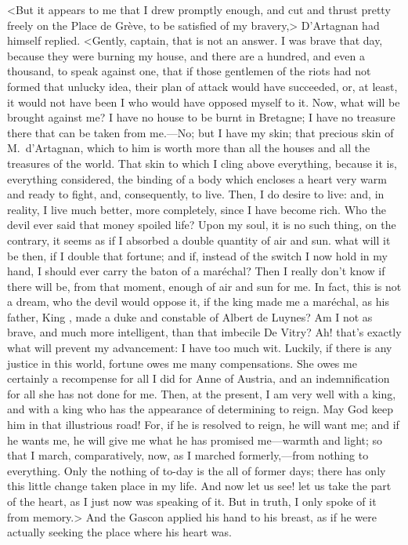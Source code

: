 <But it appears to me that I drew promptly enough, and cut and thrust pretty freely on the Place de Grève, to be satisfied of my bravery,> D'Artagnan had himself replied. <Gently, captain, that is not an answer. I was brave that day, because they were burning my house, and there are a hundred, and even a thousand, to speak against one, that if those gentlemen of the riots had not formed that unlucky idea, their plan of attack would have succeeded, or, at least, it would not have been I who would have opposed myself to it. Now, what will be brought against me? I have no house to be burnt in Bretagne; I have no treasure there that can be taken from me.—No; but I have my skin; that precious skin of M.~d'Artagnan, which to him is worth more than all the houses and all the treasures of the world. That skin to which I cling above everything, because it is, everything considered, the binding of a body which encloses a heart very warm and ready to fight, and, consequently, to live. Then, I do desire to live: and, in reality, I live much better, more completely, since I have become rich. Who the devil ever said that money spoiled life? Upon my soul, it is no such thing, on the contrary, it seems as if I absorbed a double quantity of air and sun.  what will it be then, if I double that fortune; and if, instead of the switch I now hold in my hand, I should ever carry the baton of a maréchal? Then I really don't know if there will be, from that moment, enough of air and sun for me. In fact, this is not a dream, who the devil would oppose it, if the king made me a maréchal, as his father, King , made a duke and constable of Albert de Luynes? Am I not as brave, and much more intelligent, than that imbecile De Vitry? Ah! that's exactly what will prevent my advancement: I have too much wit. Luckily, if there is any justice in this world, fortune owes me many compensations. She owes me certainly a recompense for all I did for Anne of Austria, and an indemnification for all she has not done for me. Then, at the present, I am very well with a king, and with a king who has the appearance of determining to reign. May God keep him in that illustrious road! For, if he is resolved to reign, he will want me; and if he wants me, he will give me what he has promised me—warmth and light; so that I march, comparatively, now, as I marched formerly,—from nothing to everything. Only the nothing of to-day is the all of former days; there has only this little change taken place in my life. And now let us see! let us take the part of the heart, as I just now was speaking of it. But in truth, I only spoke of it from memory.> And the Gascon applied his hand to his breast, as if he were actually seeking the place where his heart was.

